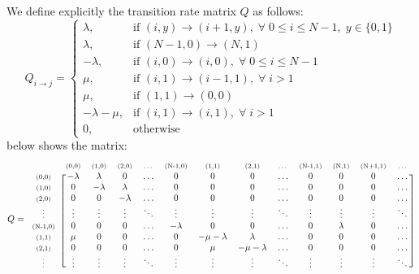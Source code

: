 \documentclass[12pt]{article}
\newcommand{\matindex}[1]{\mbox{\scriptsize#1}}%
\begin{document}
\noindent We define explicitly the transition rate matrix $Q$ as follows: \begin{equation}
    Q_{i \to j} = \begin{cases}
        \lambda, & \text{if } (i,y) \to (i+1,y), \;\forall \; 0 \leq i \leq N-1, \; y \in \{0,1\} \\ 
        \lambda, & \text{if } (N-1, 0) \to (N,1) \\ 
        -\lambda, & \text{if } (i, 0) \to (i,0), \;\forall \; 0 \leq i \leq N-1 \\ 
        \mu, & \text{if } (i, 1) \to (i-1,1), \; \forall \; i>1 \\ 
        \mu, & \text{if } (1,1) \to (0,0) \\ 
        -\lambda-\mu, & \text{if } (i, 1) \to  (i,1), \; \forall \; i > 1 \\ 
        0, & \text{otherwise}
    \end{cases}
\end{equation} below shows the matrix: \begin{equation*}
    Q = \begin{blockarray}{ccccccccccccc}
        & \matindex{(0,0)} & \matindex{(1,0)} &\matindex{(2,0)} &\matindex{\dots} &\matindex{(N-1,0)} &\matindex{(1,1)} &\matindex{(2,1)} &\matindex{\dots} &\matindex{(N-1,1)} &\matindex{(N,1)} &\matindex{(N+1,1)} &\matindex{\dots} \\ 
        \begin{block}{c[cccccccccccc]}
            \matindex{(0,0)} & -\lambda & \lambda & 0 & \dots & 0 & 0 & 0 & \dots & 0 & 0 & 0 & \dots \\
            \matindex{(1,0)} & 0 & -\lambda & \lambda & \dots & 0 & 0 & 0 & \dots & 0 & 0 & 0 & \dots \\
            \matindex{(2,0)} & 0 & 0 & -\lambda & \dots & 0 & 0 & 0 & \dots & 0 & 0 & 0 & \dots \\
            \matindex{\vdots} & \vdots & \vdots &\vdots & \ddots &\vdots & \vdots &\vdots & \ddots &\vdots & \vdots &\vdots & \ddots \\ 
            \matindex{(N-1,0)} & 0 & 0 & 0 & \dots & -\lambda & 0 & 0 & \dots & 0 & \lambda & 0 & \dots \\
            \matindex{(1,1)} & \mu & 0 & 0 & \dots & 0 & -\mu-\lambda & \lambda & \dots & 0 & 0 & 0 & \dots \\
            \matindex{(2,1)} & 0 & 0 & 0 & \dots & 0 & \mu & -\mu-\lambda & \dots & 0 & 0 & 0 & \dots \\
            \matindex{\vdots} & \vdots & \vdots &\vdots & \ddots &\vdots & \vdots &\vdots & \ddots &\vdots & \vdots &\vdots & \ddots \\ 

\end{block}
\end{blockarray}
\end{equation*}
\end{document}
